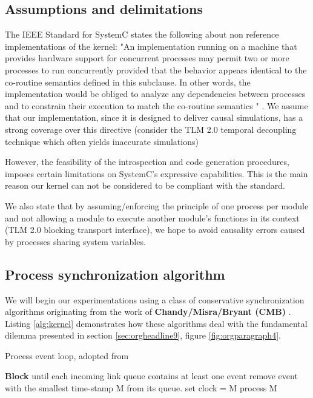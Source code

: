 \documentclass[12pt,twoside]{article}
\begin{document}
\subsection{Assumptions and delimitations}
\label{sec:orgheadline14}
The IEEE Standard for SystemC states the following about non reference implementations of the kernel:
"An implementation running on a machine that provides hardware support for concurrent processes may permit two or more processes to run concurrently
provided that the behavior appears identical to the co-routine semantics defined in this subclause.
In other words, the implementation would be obliged to analyze any dependencies between processes and to constrain their execution to match the co-routine semantics " \cite{OpenSystemCInitiative2012}.
We assume that our implementation, since it is designed to deliver causal simulations, has a strong coverage over this directive (consider the TLM 2.0 temporal decoupling technique which often yields inaccurate simulations)

However, the feasibility of the introspection and code generation procedures, imposes certain limitations on SystemC's expressive capabilities.
This is the main reason our kernel can not be considered to be compliant with the standard.

We also state that by assuming/enforcing the principle of one process per module and not allowing a module to execute another module's functions in its context (TLM 2.0 blocking transport interface), 
we hope to avoid causality errors caused by processes sharing system variables.




\subsection{Process synchronization algorithm}
\label{sec:orgheadline15}
We will begin our experimentations using a class of conservative synchronization algorithms originating from the work of \textbf{Chandy/Misra/Bryant (CMB)} \cite{Bryant,Chandy1979}.
Listing \ref{alg:kernel} demonstrates how these algorithms deal with the fundamental dilemma presented in section \ref{sec:orgheadline9}, figure \ref{fig:orgparagraph4}.

\begin{algorithm}
\caption{Process event loop, adopted from \cite{Fujimoto1999}}
\label{alg:initial_CMB}
\begin{algorithmic}[2]

      \State \textbf{Block} until each incoming link queue contains at least one event
      \State remove event with the smallest time-stamp M from its queue.
      \State set clock = M
      \State process M
   \EndWhile

\end{algorithmic}
\end{algorithm}
\end{document}
